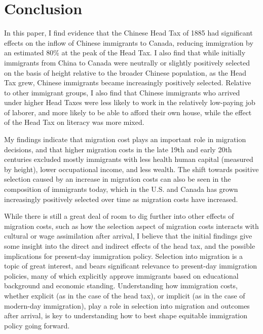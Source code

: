 \section{Conclusion}

In this paper, I find evidence that the Chinese Head Tax of 1885 had significant effects on the inflow of Chinese immigrants to Canada, reducing immigration by an estimated 80\% at the peak of the Head Tax. I also find that while initially immigrants from China to Canada were neutrally or slightly positively selected on the basis of height relative to the broader Chinese population, as the Head Tax grew, Chinese immigrants became increasingly positively selected. Relative to other immigrant groups, I also find that Chinese immigrants who arrived under higher Head Taxes were less likely to work in the relatively low-paying job of laborer, and more likely to be able to afford their own house, while the effect of the Head Tax on literacy was more mixed. 

My findings indicate that migration cost plays an important role in migration decisions, and that higher migration costs in the late 19th and early 20th centuries excluded mostly immigrants with less health human capital (measured by height), lower occupational income, and less wealth. The shift towards positive selection caused by an increase in migration costs can also be seen in the composition of immigrants today, which in the U.S. and Canada has grown increasingly positively selected over time as migration costs have increased. 

While there is still a great deal of room to dig further into other effects of migration costs, such as how the selection aspect of migration costs interacts with cultural or wage assimilation after arrival, I believe that the initial findings give some insight into the direct and indirect effects of the head tax, and the possible implications for present-day immigration policy. Selection into migration is a topic of great interest, and bears significant relevance to present-day immigration policies, many of which explicitly approve immigrants based on educational background and economic standing. Understanding how immigration costs, whether explicit (as in the case of the head tax), or implicit (as in the case of modern-day immigration), play a role in selection into migration and outcomes after arrival, is key to understanding how to best shape equitable immigration policy going forward. 

